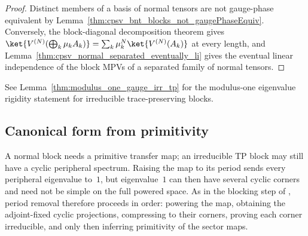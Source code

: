 \begin{proof}\leanok
    Distinct members of a basis of normal tensors are not gauge-phase
    equivalent by Lemma~\ref{thm:cpsv_bnt_blocks_not_gaugePhaseEquiv}.
    Conversely, the block-diagonal decomposition theorem gives
    $\ket{V^{(N)}(\bigoplus_k\mu_kA_k)}=\sum_k\mu_k^N\ket{V^{(N)}(A_k)}$ at every
    length, and Lemma~\ref{thm:cpsv_normal_separated_eventually_li} gives the
    eventual linear independence of the block MPVs of a separated family of
    normal tensors.
\end{proof}



\begin{remark}
    See Lemma~\ref{thm:modulus_one_gauge_irr_tp} for the modulus-one
    eigenvalue rigidity statement for irreducible trace-preserving blocks.
\end{remark}


\subsection{Canonical form from primitivity}\label{sec:canonical_from_primitivity}

A normal block needs a primitive transfer map; an irreducible TP block may still
have a cyclic peripheral spectrum. Raising the map to its period sends every
peripheral eigenvalue to~$1$, but eigenvalue~$1$ can then have several cyclic
corners and need not be simple on the full powered space. As in the blocking
step of \cite[Section~2.3]{Cirac2016MPDO_arXiv}, period removal
therefore proceeds in order: powering the map, obtaining the adjoint-fixed cyclic
projections, compressing to their corners, proving each corner irreducible, and only
then inferring primitivity of the sector maps.

